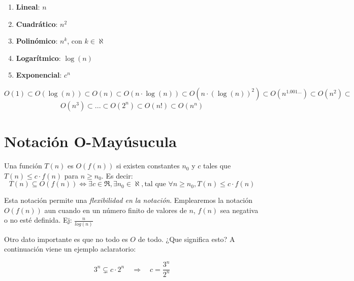 \documentclass[10pt,a4paper,spanish]{report}
\theoremstyle{definition}
\theoremstyle{remark}
\begin{document}
    \begin{enumerate}[$\spadesuit$]
        \item \textbf{\textcolor{YellowOrange}{Lineal}}: $n$
        \item \textbf{\textcolor{YellowOrange}{Cuadrático}}: $n^2$
        \item \textbf{\textcolor{YellowOrange}{Polinómico}}: $n^k$, con $k \in \aleph$
        \item \textbf{\textcolor{YellowOrange}{Logarítmico}}: $\log(n)$
        \item \textbf{\textcolor{YellowOrange}{Exponencial}}: $c^n$
    \end{enumerate}

    \begin{displaymath}
        O(1) \subset O(\log(n)) \subset O(n) \subset O(n\cdot \log(n)) \subset O (n \cdot (\log(n))^2) \subset O(n^{1.001...}) \subset O(n^2) \subset 
    \end{displaymath}
    \begin{displaymath}
        O(n^3) \subset ... \subset O(2^n) \subset O(n!) \subset O(n^n)
    \end{displaymath}

    \section{\textcolor{YellowOrange}Notación O-Mayúsucula}

    Una función $T(n)$ es $O(f(n))$ si existen constantes $n_0$ y $c$ tales que $T(n) \leq c\cdot f(n)$ para $n \geq n_0$. Es decir:
    \begin{displaymath}
        T(n) \subseteq O(f(n)) \Leftrightarrow \exists c \in \Re, \exists n_0 \in \aleph, \text{tal que } \forall n \geq n_0, T(n) \leq c\cdot f(n)
    \end{displaymath}

    Esta notación permite una \textit{\textcolor{YellowOrange}{flexibilidad en la notación}}. Emplearemos la notación $O(f(n))$ aun cuando en un número finito de valores de $n$, $f(n)$ sea negativa o no esté definida. Ej: $\frac{n}{log(n)}$

    Otro dato importante es que no todo es $O$ de todo. ¿Que significa esto? A continuación viene un ejemplo aclaratorio:

    \begin{displaymath}
        3^n \subsetneq c \cdot 2^n \quad \Rightarrow \quad c = \frac{3^n}{2^n}
    \end{displaymath}
\end{document}
